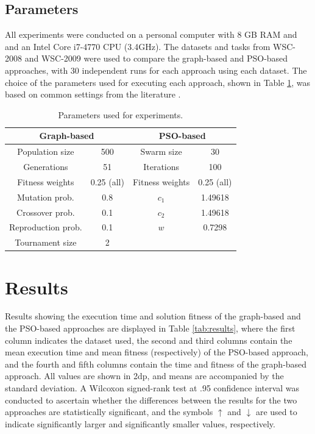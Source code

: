 \documentclass{llncs}
\begin{document}
\subsection{Parameters}

All experiments were conducted on a personal computer with 8 GB RAM and and an Intel Core i7-4770 CPU (3.4GHz). The datasets and tasks from WSC-2008 \cite{bansal2008wsc} and WSC-2009 \cite{kona2009wsc} were used to compare the graph-based and PSO-based approaches, with 30 independent runs for each approach using each dataset. The choice of the parameters used for executing each approach, shown in Table \ref{tab:parameters}, was based on common settings from the literature \cite{koza1992genetic,eberhart2001particle}.

\begin{table}[h]
\centering
\caption{Parameters used for experiments.}
\label{tab:parameters}
\begin{tabular}{|c|c|c|c|}
\hline
\multicolumn{2}{|c|}{{\bf Graph-based}} & \multicolumn{2}{c|}{{\bf PSO-based}} \\ \hline
Population size        & 500            & Swarm size          & 30             \\ \hline
Generations            & 51             & Iterations          & 100            \\ \hline
Fitness weights        & 0.25 (all)     & Fitness weights     & 0.25 (all)     \\ \hline
Mutation prob.         & 0.8            & $c_1$               & 1.49618        \\ \hline
Crossover prob.        & 0.1            & $c_2$               & 1.49618        \\ \hline
Reproduction prob.     & 0.1            & $w$                 & 0.7298         \\ \hline
Tournament size        & 2              &                     &                \\ \hline
\end{tabular}
\end{table}

\section{Results}\label{results}

Results showing the execution time and solution fitness of the graph-based and the PSO-based approaches are displayed in Table \ref{tab:results}, where the first column indicates the dataset used, the second and third columns contain the mean execution time and mean fitness (respectively) of the PSO-based approach, and the fourth and fifth columns contain the time and fitness of the graph-based approach. All values are shown in 2dp, and means are accompanied by the standard deviation. A Wilcoxon signed-rank test at .95 confidence interval was conducted to ascertain whether the differences between the results for the two approaches are statistically significant, and the symbols $\uparrow$ and $\downarrow$ are used to indicate significantly larger and significantly smaller values, respectively.
\end{document}

